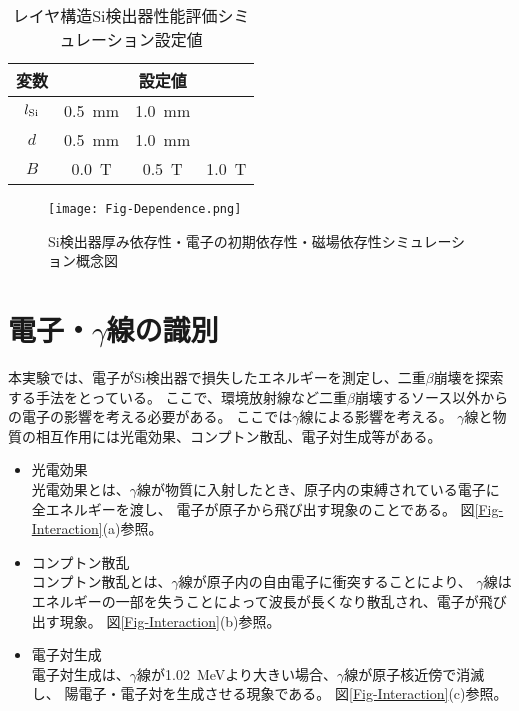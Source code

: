 \documentclass[a4paper,10pt]{jreport}
\begin{document}
\begin{table}[H] 
	\center
	\caption{レイヤ構造Si検出器性能評価シミュレーション設定値} \label{Tab-Dpendence}
	\begin{tabular}{cccc}
		\hline
		変数 & & 設定値 & \\
		\hline
		$l_{\rm{Si}}$ &  \SI{0.5}{mm} & \SI{1.0}{mm} & \\
		$d$ & \SI{0.5}{mm} & \SI{1.0}{mm} & \\
		$B$ & \SI{0.0}{T} & \SI{0.5}{T} & \SI{1.0}{T} \\
		\hline
	\end{tabular}
\end{table}

\begin{figure}[H]
	\center
	\texttt{[image: Fig-Dependence.png]}
	\caption{Si検出器厚み依存性・電子の初期依存性・磁場依存性シミュレーション概念図} \label{Fig-Dependence}
\end{figure}



\section{電子・$\gamma$線の識別}

本実験では、電子がSi検出器で損失したエネルギーを測定し、二重$\beta$崩壊を探索する手法をとっている。
ここで、環境放射線など二重$\beta$崩壊するソース以外からの電子の影響を考える必要がある。
ここでは$\gamma$線による影響を考える。
$\gamma$線と物質の相互作用には光電効果、コンプトン散乱、電子対生成等がある。

\begin{itemize}
	\item 光電効果 \\
	光電効果とは、$\gamma$線が物質に入射したとき、原子内の束縛されている電子に全エネルギーを渡し、
	電子が原子から飛び出す現象のことである。
	図\ref{Fig-Interaction}(a)参照。
	
	\item コンプトン散乱 \\
	コンプトン散乱とは、$\gamma$線が原子内の自由電子に衝突することにより、
	$\gamma$線はエネルギーの一部を失うことによって波長が長くなり散乱され、電子が飛び出す現象。
	図\ref{Fig-Interaction}(b)参照。
	
	\item 電子対生成 \\
	電子対生成は、$\gamma$線が\SI{1.02}{MeV}より大きい場合、$\gamma$線が原子核近傍で消滅し、
	陽電子・電子対を生成させる現象である。
	図\ref{Fig-Interaction}(c)参照。
\end{itemize}
\end{document}
